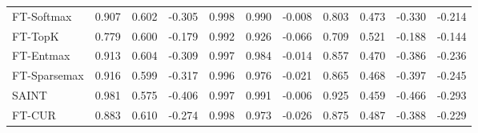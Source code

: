 \begin{table}[ht]
\begin{tabular}{lcccccccccc}
    FT-Softmax & 0.907 & 0.602 & -0.305 & 0.998 & 0.990 & -0.008 & 0.803 & 0.473 & -0.330 & -0.214 \\
    FT-TopK & 0.779 & 0.600 & -0.179 & 0.992 & 0.926 & -0.066 & 0.709 & 0.521 & -0.188 & -0.144 \\
    FT-Entmax & 0.913 & 0.604 & -0.309 & 0.997 & 0.984 & -0.014 & 0.857 & 0.470 & -0.386 & -0.236 \\
    FT-Sparsemax & 0.916 & 0.599 & -0.317 & 0.996 & 0.976 & -0.021 & 0.865 & 0.468 & -0.397 & -0.245 \\
    SAINT & 0.981 & 0.575 & -0.406 & 0.997 & 0.991 & -0.006 & 0.925 & 0.459 & -0.466 & -0.293 \\
    FT-CUR & 0.883 & 0.610 & -0.274 & 0.998 & 0.973 & -0.026 & 0.875 & 0.487 & -0.388 & -0.229 \\
    \bottomrule
  \end{tabular}
\end{table}
